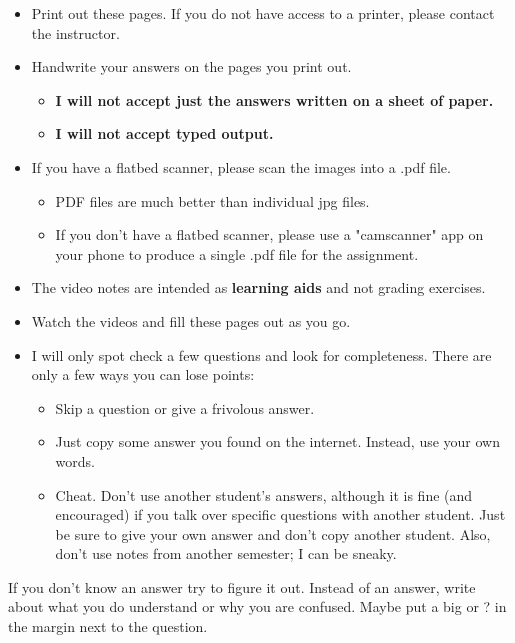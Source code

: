 \documentclass[letterpaper,12pt]{exam}
\begin{document}
\begin{itemize}
	\item Print out these pages.  If you do not have access to a printer, please contact the instructor.
	\item Handwrite your answers on the pages you print out. 
	   \begin{itemize}
		  \item \textbf{I will not accept just the answers written on a sheet of paper.}  
		  \item \textbf{I will not accept typed output.}
	   \end{itemize}
	\item If you have a flatbed scanner, please scan the images into a .pdf file.  
	  \begin{itemize}
         \item PDF files are much better than individual jpg files.
         \item If you don't have a flatbed scanner, please use a "camscanner" app on your phone to produce a single .pdf file for the assignment.
      \end{itemize}

	\item The video notes are intended as \textbf{learning aids} and not grading exercises.
	\item Watch the videos and fill these pages out as you go.
	\item I will only spot check a few questions and look for completeness.  There are only a few ways you can lose points:
	   \begin{itemize}
	     \item Skip a question or give a frivolous answer. 
		 \item Just copy some answer you found on the internet.  Instead, use your own words.
	     \item Cheat.  Don't use another student's answers, although it is fine (and encouraged) if you talk over specific questions with another student.  Just be sure to give your own answer and don't copy another student.  Also, don't use notes from another semester; I can be sneaky.
	   \end{itemize}
	\end{itemize}

If you don't know an answer try to figure it out.  Instead of an answer,
write about what you do understand or why you are confused.  Maybe put a big \textcolor{BrickRed}{\Huge*} or \textcolor{BrickRed}{\Huge?} in the margin next to 
the question.
\end{document}
